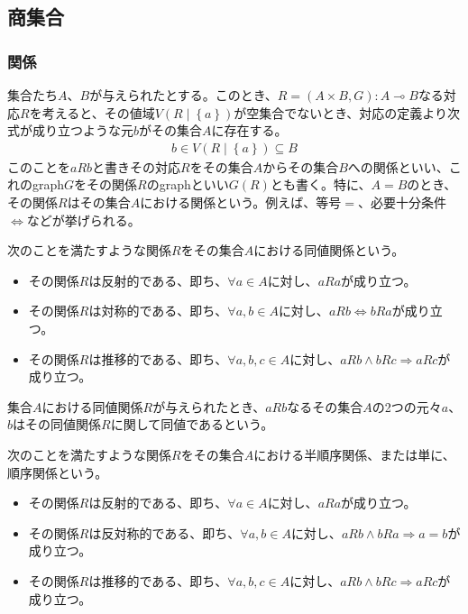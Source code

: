 \documentclass[dvipdfmx]{jsarticle}
\begin{document}
\subsection{商集合}%
\subsubsection{関係}%
\begin{dfn}
集合たち$A$、$B$が与えられたとする。このとき、$R = (A \times B,G):A \multimap B$なる対応$R$を考えると、その値域$V\left( R \middle| \left\{ a \right\} \right)$が空集合でないとき、対応の定義より次式が成り立つような元$b$がその集合$A$に存在する。
\begin{align*}
b \in V\left( R \middle| \left\{ a \right\} \right) \subseteq B
\end{align*}
このことを$aRb$と書きその対応$R$をその集合$A$からその集合$B$への関係といい、これのgraph$G$をその関係$R$のgraphといい$G(R)$とも書く。特に、$A = B$のとき、その関係$R$はその集合$A$における関係という。例えば、等号$=$、必要十分条件$\Leftrightarrow$などが挙げられる。
\end{dfn}
\begin{axs}
次のことを満たすような関係$R$をその集合$A$における同値関係という。
\begin{itemize}
\item
  その関係$R$は反射的である、即ち、$\forall a \in A$に対し、$aRa$が成り立つ。
\item
  その関係$R$は対称的である、即ち、$\forall a,b \in A$に対し、$aRb \Leftrightarrow bRa$が成り立つ。
\item
  その関係$R$は推移的である、即ち、$\forall a,b,c \in A$に対し、$aRb \land bRc \Rightarrow aRc$が成り立つ。
\end{itemize}
集合$A$における同値関係$R$が与えられたとき、$aRb$なるその集合$A$の2つの元々$a$、$b$はその同値関係$R$に関して同値であるという。
\end{axs}
\begin{axs}
次のことを満たすような関係$R$をその集合$A$における半順序関係、または単に、順序関係という。
\begin{itemize}
\item
  その関係$R$は反射的である、即ち、$\forall a \in A$に対し、$aRa$が成り立つ。
\item
  その関係$R$は反対称的である、即ち、$\forall a,b \in A$に対し、$aRb \land bRa \Rightarrow a = b$が成り立つ。
\item
  その関係$R$は推移的である、即ち、$\forall a,b,c \in A$に対し、$aRb \land bRc \Rightarrow aRc$が成り立つ。
\end{itemize}
\end{axs}
\end{document}
